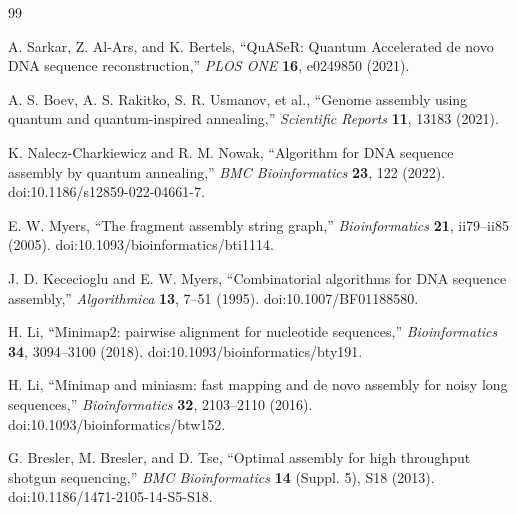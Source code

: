 \documentclass[a4j,10pt]{ujarticle}
\begin{document}
\begin{thebibliography}{99}


A. Sarkar, Z. Al-Ars, and K. Bertels,
``QuASeR: Quantum Accelerated de novo DNA sequence reconstruction,''
\textit{PLOS ONE}
\textbf{16}, e0249850 (2021).

A. S. Boev, A. S. Rakitko, S. R. Usmanov, et al.,
``Genome assembly using quantum and quantum-inspired annealing,''
\textit{Scientific Reports}
\textbf{11}, 13183 (2021).

K. Nalecz-Charkiewicz and R. M. Nowak,
``Algorithm for DNA sequence assembly by quantum annealing,''
\textit{BMC Bioinformatics}
\textbf{23}, 122 (2022).
doi:10.1186/s12859-022-04661-7.


E. W. Myers,
``The fragment assembly string graph,''
\textit{Bioinformatics}
\textbf{21}, ii79--ii85 (2005).
doi:10.1093/bioinformatics/bti1114.

J. D. Kececioglu and E. W. Myers,
``Combinatorial algorithms for DNA sequence assembly,''
\textit{Algorithmica}
\textbf{13}, 7--51 (1995).
doi:10.1007/BF01188580.


H. Li,
``Minimap2: pairwise alignment for nucleotide sequences,''
\textit{Bioinformatics}
\textbf{34}, 3094--3100 (2018).
doi:10.1093/bioinformatics/bty191.

H. Li,
``Minimap and miniasm: fast mapping and de novo assembly
for noisy long sequences,''
\textit{Bioinformatics}
\textbf{32}, 2103--2110 (2016).
doi:10.1093/bioinformatics/btw152.


G. Bresler, M. Bresler, and D. Tse,
``Optimal assembly for high throughput shotgun sequencing,''
\textit{BMC Bioinformatics}
\textbf{14} (Suppl. 5), S18 (2013).
doi:10.1186/1471-2105-14-S5-S18.


\end{thebibliography}
\end{document}
